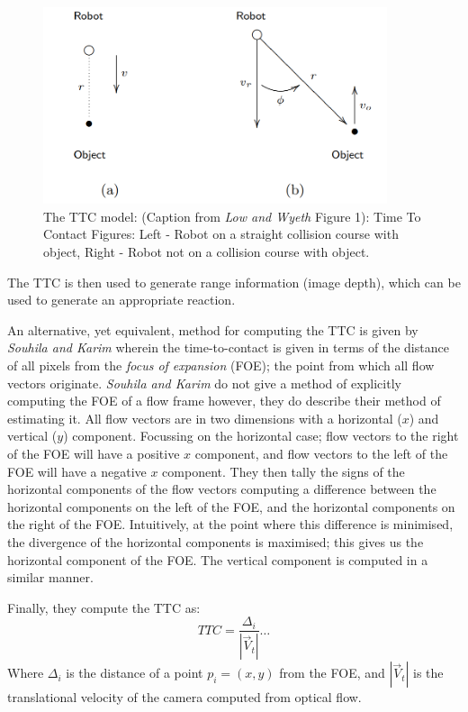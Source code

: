 \documentclass[a4paper,12pt,twoside,openright]{article}
\begin{document}
\begin{figure}
  \centering
  \includegraphics[width=0.9\textwidth]{LowOFModel}
  \caption{
    \label{fig:lowof} The TTC model: (Caption from \textit{Low and Wyeth} Figure 1):
    Time To Contact Figures: Left - Robot on a straight collision course with object,
    Right - Robot not on a collision course with object.
  }
\end{figure}


The TTC is then used to generate range information (image depth), which can be used to generate an
appropriate reaction.
\newline

An alternative, yet equivalent, method for computing the TTC is given by \textit{Souhila and Karim}
wherein the time-to-contact is given in terms of the distance of all pixels from the \textit{focus of expansion}
(FOE); the point from which all flow vectors originate. \textit{Souhila and Karim} do
not give a method of explicitly computing the FOE of a flow frame
however, they do describe their method of estimating it. All flow vectors are in two dimensions with a
horizontal ($x$) and vertical ($y$) component. Focussing on the horizontal case; flow vectors to the
right of the FOE will have a positive $x$ component, and flow vectors to the left of the FOE will have a negative
$x$ component. They then tally the signs of the horizontal components of the flow vectors computing a
difference between the horizontal components on the left of the FOE, and the horizontal components on the
right of the FOE. Intuitively, at the point where this difference is minimised, the divergence of the
horizontal components is maximised; this gives us the horizontal component of the FOE. The vertical
component is computed in a similar manner.
\newline

Finally, they compute the TTC as:
\begin{equation}
TTC = \frac{\Delta_i}{|\vec{V}_t|} \dots
\end{equation}
Where $\Delta_i$ is the distance of a point $p_i = (x,y)$ from the FOE, and $|\vec{V}_t|$ is the
translational velocity of the camera computed from optical flow\cite{Souhila2007}.
\newline
\end{document}
